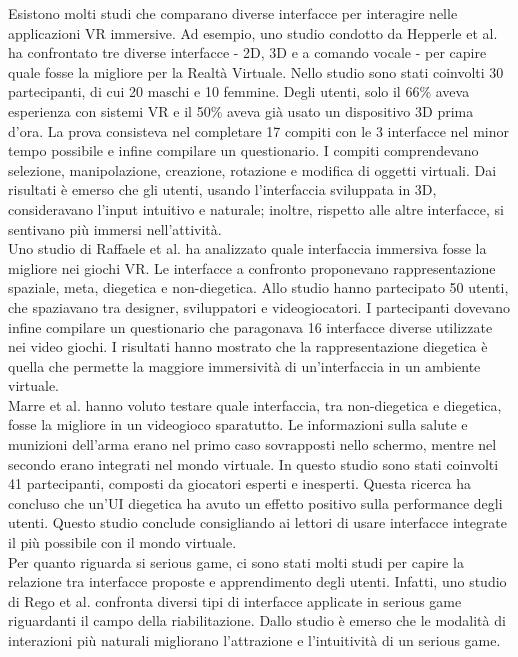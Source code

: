 \documentclass[target=bach,aauheader=]{thud}
\begin{document}
Esistono molti studi che comparano diverse interfacce per interagire nelle applicazioni VR immersive.
Ad esempio, uno studio condotto da Hepperle et al. \cite{Hepperle} ha confrontato tre diverse interfacce - 2D, 3D e a comando vocale - per capire quale fosse la migliore per la Realtà Virtuale.  
Nello studio sono stati coinvolti 30 partecipanti, di cui 20 maschi e 10 femmine.
Degli utenti, solo il 66\% aveva esperienza con sistemi VR e il 50\% aveva già usato un dispositivo 3D prima d'ora.
La prova consisteva nel completare 17 compiti con le 3 interfacce nel minor tempo possibile e infine compilare un questionario.
I compiti comprendevano selezione, manipolazione, creazione, rotazione e modifica di oggetti virtuali.
Dai risultati è emerso che gli utenti, usando l'interfaccia sviluppata in 3D, consideravano l'input intuitivo e naturale; inoltre, rispetto alle altre interfacce, si sentivano più immersi nell'attività. \\

Uno studio di Raffaele et al. \cite{Raffaele} ha analizzato quale interfaccia immersiva fosse la migliore nei giochi VR.
Le interfacce a confronto proponevano rappresentazione spaziale, meta, diegetica e non-diegetica.
Allo studio hanno partecipato 50 utenti, che spaziavano tra designer, sviluppatori e videogiocatori.
I partecipanti dovevano infine compilare un questionario che paragonava 16 interfacce diverse utilizzate nei video giochi.
I risultati hanno mostrato che la rappresentazione diegetica è quella che permette la maggiore immersività di un'interfaccia in un ambiente virtuale. \\

Marre et al. \cite{Marre} hanno voluto testare quale interfaccia, tra non-diegetica e diegetica, fosse la migliore in un videogioco sparatutto.
Le informazioni sulla salute e munizioni dell'arma erano nel primo caso sovrapposti nello schermo, mentre nel secondo erano integrati nel mondo virtuale.
In questo studio sono stati coinvolti 41 partecipanti, composti da giocatori esperti e inesperti. 
Questa ricerca ha concluso che un'UI diegetica ha avuto un effetto positivo sulla performance degli utenti.
Questo studio conclude consigliando ai lettori di usare interfacce integrate il più possibile con il mondo virtuale. \\

Per quanto riguarda si serious game, ci sono stati molti studi per capire la relazione tra interfacce proposte e apprendimento degli utenti.
Infatti, uno studio di Rego et al. \cite{Rego} confronta diversi tipi di interfacce applicate in serious game riguardanti il campo della riabilitazione.
Dallo studio è emerso che le modalità di interazioni più naturali migliorano l'attrazione e l'intuitività di un serious game.
\end{document}
